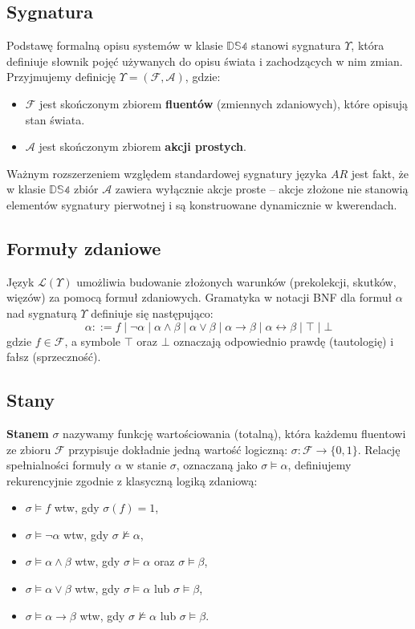 \documentclass[11pt,a4paper]{article}
\theoremstyle{definition}
\begin{document}
\subsection{Sygnatura}
Podstawę formalną opisu systemów w klasie $\mathbb{DS4}$ stanowi sygnatura $\Upsilon$, która definiuje słownik pojęć używanych do opisu świata i zachodzących w nim zmian. Przyjmujemy definicję $\Upsilon = (\mathcal{F}, \mathcal{A})$, gdzie:\begin{itemize}\item $\mathcal{F}$ jest skończonym zbiorem \textbf{fluentów} (zmiennych zdaniowych), które opisują stan świata.\item $\mathcal{A}$ jest skończonym zbiorem \textbf{akcji prostych}.\end{itemize}Ważnym rozszerzeniem względem standardowej sygnatury języka $AR$ jest fakt, że w klasie $\mathbb{DS4}$ zbiór $\mathcal{A}$ zawiera wyłącznie akcje proste – akcje złożone nie stanowią elementów sygnatury pierwotnej i są konstruowane dynamicznie w kwerendach.

\subsection{Formuły zdaniowe}

Język $\mathcal{L}(\Upsilon)$ umożliwia budowanie złożonych warunków (prekolekcji, skutków, więzów) za pomocą formuł zdaniowych. Gramatyka w notacji BNF dla formuł $\alpha$ nad sygnaturą $\Upsilon$ definiuje się następująco:$$\alpha ::= f \mid \neg\alpha \mid \alpha \land \beta \mid \alpha \lor \beta \mid \alpha \to \beta \mid \alpha \leftrightarrow \beta \mid \top \mid \bot$$gdzie $f \in \mathcal{F}$, a symbole $\top$ oraz $\bot$ oznaczają odpowiednio prawdę (tautologię) i fałsz (sprzeczność).

\subsection{Stany}

\textbf{Stanem} $\sigma$ nazywamy funkcję wartościowania (totalną), która każdemu fluentowi ze zbioru $\mathcal{F}$ przypisuje dokładnie jedną wartość logiczną: $\sigma\colon \mathcal{F} \to \{0,1\}$.
Relację spełnialności formuły $\alpha$ w stanie $\sigma$, oznaczaną jako $\sigma \models \alpha$, definiujemy rekurencyjnie zgodnie z klasyczną logiką zdaniową:
\begin{itemize}
\item $\sigma \models f$ wtw, gdy $\sigma(f) = 1$,
\item $\sigma \models \neg\alpha$ wtw, gdy $\sigma \not\models \alpha$,
\item $\sigma \models \alpha \land \beta$ wtw, gdy $\sigma \models \alpha$ oraz $\sigma \models \beta$,
\item $\sigma \models \alpha \lor \beta$ wtw, gdy $\sigma \models \alpha$ lub $\sigma \models \beta$,
\item $\sigma \models \alpha \to \beta$ wtw, gdy $\sigma \not\models \alpha$ lub $\sigma \models \beta$.
\end{itemize}
\end{document}
